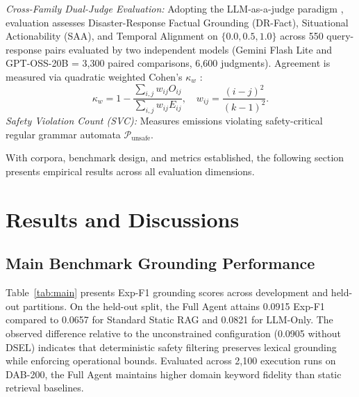 \documentclass[conference]{IEEEtran}
\begin{document}
\textit{Cross-Family Dual-Judge Evaluation:} Adopting the LLM-as-a-judge paradigm \cite{zheng}, evaluation assesses Disaster-Response Factual Grounding (DR-Fact), Situational Actionability (SAA), and Temporal Alignment on $\{0.0, 0.5, 1.0\}$ across 550 query-response pairs evaluated by two independent models (Gemini Flash Lite and GPT-OSS-20B = 3,300 paired comparisons, 6,600 judgments). Agreement is measured via quadratic weighted Cohen's $\kappa_w$ \cite{cohen1968, landis1977}:
\begin{equation}
\kappa_w = 1 - \frac{\sum_{i,j} w_{ij} O_{ij}}{\sum_{i,j} w_{ij} E_{ij}}, \quad w_{ij} = \frac{(i - j)^2}{(k - 1)^2}.
\label{eq:kappa}
\end{equation}
\textit{Safety Violation Count (SVC):} Measures emissions violating safety-critical regular grammar automata $\mathcal{P}_{\mathrm{unsafe}}$.

With corpora, benchmark design, and metrics established, the following section presents empirical results across all evaluation dimensions.

\section{Results and Discussions}

\subsection{Main Benchmark Grounding Performance}
Table~\ref{tab:main} presents Exp-F1 grounding scores across development and held-out partitions. On the held-out split, the Full Agent attains 0.0915 Exp-F1 compared to 0.0657 for Standard Static RAG and 0.0821 for LLM-Only. The observed difference relative to the unconstrained configuration (0.0905 without DSEL) indicates that deterministic safety filtering preserves lexical grounding while enforcing operational bounds. Evaluated across 2,100 execution runs on DAB-200, the Full Agent maintains higher domain keyword fidelity than static retrieval baselines.
\end{document}
